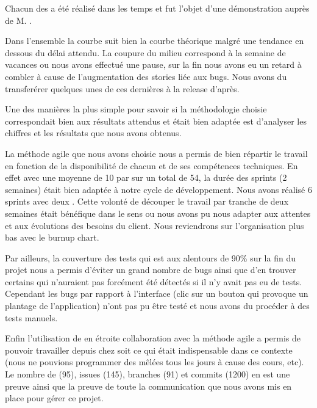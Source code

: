 Chacun des \Sprints{} a été réalisé dans les temps et fut l'objet d'une démonstration auprès de M. . 

Dans l’ensemble la courbe suit bien la courbe théorique malgré une tendance en dessous du délai attendu. La coupure du milieu correspond à la semaine de vacances ou nous avons effectué une pause, sur la fin nous avons eu un retard à combler à cause de l’augmentation des stories liée aux bugs. Nous avons du transferérer quelques unes de ces dernières à la release d’après.


Une des manières la plus simple pour savoir si la méthodologie choisie correspondait bien aux résultats attendus et était bien adaptée est d'analyser les chiffres et les résultats que nous avons obtenus.

La méthode agile \Scrum{} que nous avons choisie nous a permis de bien répartir le travail en fonction de la disponibilité de chacun et de ses compétences techniques. En effet avec une moyenne de 10 \UserStories{} par \Sprint{} sur un total de 54, la durée des sprints (2 semaines) était bien adaptée à notre cycle de développement. Nous avons réalisé 6 sprints avec deux \Releases. Cette volonté de découper le travail par tranche de deux semaines était bénéfique dans le sens ou nous avons pu nous adapter aux attentes et aux évolutions des besoins du client. Nous reviendrons sur l'organisation plus bas avec le burnup chart.

Par ailleurs, la couverture des tests qui est aux alentours de 90\% sur la fin du projet nous a permis d'éviter un grand nombre de bugs ainsi que d'en trouver certains qui n'auraient pas forcément été détectés si il n'y avait pas eu de tests. Cependant les bugs par rapport à l'interface (clic sur un bouton qui provoque un plantage de l'application) n'ont pas pu être testé et nous avons du procéder à des tests manuels.

Enfin l'utilisation de \Github{} en étroite collaboration avec la méthode agile \Scrum{} a permis de pouvoir travailler depuis chez soit ce qui était indispensable dans ce contexte (nous ne pouvions programmer des mêlées tous les jours à cause des cours, etc). Le nombre de \PullRequest{} (95), issues (145), branches (91) et commits (1200) en est une preuve ainsi que la preuve de toute la communication que nous avons mis en place pour gérer ce projet.



